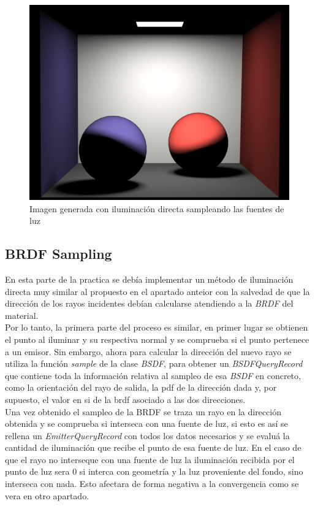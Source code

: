\documentclass[10pt,oneside,a4paper]{article}
\begin{document}
\begin{figure}[h]
\centering
\includegraphics[width=.6\linewidth]{images/cbox_direct_ems_diff_512.png}
\caption{Imagen generada con iluminación directa sampleando las fuentes de luz}
\label{fig:disp}
\end{figure} 
\subsection{BRDF Sampling}
En esta parte de la practica se debía implementar un método de iluminación directa muy similar al propuesto en el apartado anteior con la salvedad de que la dirección de los rayos incidentes debían calcularse atendiendo a la \textit{BRDF} del material.\\

Por lo tanto, la primera parte del proceso es similar, en primer lugar se obtienen el punto al iluminar y su respectiva normal y se comprueba si el punto pertenece a un emisor. Sin embargo, ahora para calcular la dirección del nuevo rayo se utiliza la función \textit{sample} de la clase \textit{BSDF}, para obtener un \textit{BSDFQueryRecord} que contiene toda la información relativa al sampleo de esa \textit{BSDF} en concreto, como la orientación del rayo de salida, la pdf de la dirección dada y, por supuesto, el valor en si de la brdf asociado a las dos direcciones.\\

Una vez obtenido el sampleo de la BRDF se traza un rayo en la dirección obtenida y se comprueba si interseca con una fuente de luz, si esto es así se rellena un \textit{EmitterQueryRecord} con todos los datos necesarios y se evaluá la cantidad de iluminación que recibe el punto de esa fuente de luz. En el caso de que el rayo no interseque con una fuente de luz la iluminación recibida por el punto de luz sera 0 si interca con geometría y la luz proveniente del fondo, sino interseca con nada. Esto afectara de forma negativa a la convergencia como se vera en otro apartado.\\
\end{document}
